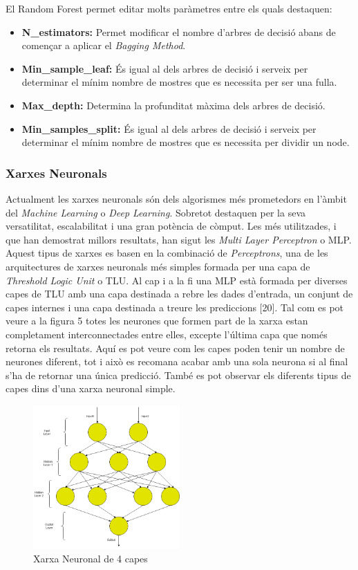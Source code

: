 \documentclass[10pt,a4paper,twocolumn,twoside]{article}
\begin{document}
El Random Forest permet editar molts paràmetres entre els quals destaquen:
\begin{itemize}
\item \textbf{N\_estimators:} Permet modificar el nombre d'arbres de decisió abans de començar a aplicar el \textit{Bagging Method}.
\item \textbf{Min\_sample\_leaf:} És igual al dels arbres de decisió i serveix per determinar el mínim nombre de mostres que es necessita per ser una fulla.
\item \textbf{Max\_depth:} Determina la profunditat màxima dels arbres de decisió.
\item \textbf{Min\_samples\_split:} És igual al dels arbres de decisió i serveix per determinar el mínim nombre de mostres que es necessita per dividir un node.
\end{itemize}

\subsubsection{Xarxes Neuronals}
Actualment les xarxes neuronals són dels algorismes més prometedors en l'àmbit del \textit{Machine Learning} o \textit{Deep Learning}. Sobretot destaquen per la seva versatilitat, escalabilitat i una gran potència de còmput. Les més utilitzades, i que han demostrat millors resultats, han sigut les \textit{Multi Layer Perceptron} o MLP. Aquest tipus de xarxes es basen en la combinació de \textit{Perceptrons}, una de les arquitectures de xarxes neuronals més simples formada per una capa de \textit{Threshold Logic Unit} o TLU. Al cap i a la fi una MLP està formada per diverses capes de TLU amb una capa destinada a rebre les dades d'entrada, un conjunt de capes internes i una capa destinada a treure les prediccions [20]. Tal com es pot veure a la figura 5 totes les neurones que formen part de la xarxa estan completament interconnectades entre elles, excepte l'última capa que només retorna els resultats. Aquí es pot veure com les capes poden tenir un nombre de neurones diferent, tot i això es recomana acabar amb una sola neurona si al final s'ha de retornar una única predicció. També es pot observar els diferents tipus de capes dins d'una xarxa neuronal simple.
 \begin{figure}[!h]
\centering
	\includegraphics[width=0.5\textwidth]{../img/XarxaNeur}
	\caption{Xarxa Neuronal de 4 capes}
	\label{fig-XarxaNeur}
\end{figure}
\end{document}
